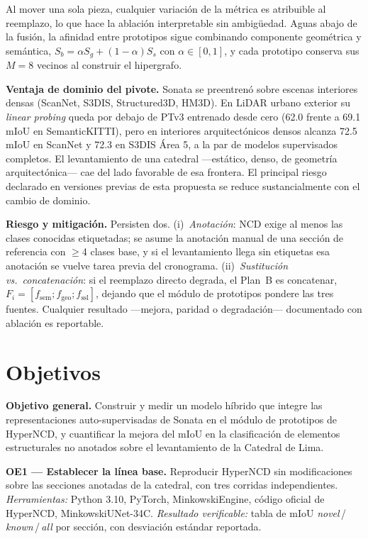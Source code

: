 \documentclass[9pt,twocolumn,a4paper]{extarticle}
\begin{document}
Al mover una sola pieza, cualquier variación de la métrica es atribuible al
reemplazo, lo que hace la ablación interpretable sin ambigüedad. Aguas abajo
de la fusión, la afinidad entre prototipos sigue combinando componente
geométrica y semántica, $S_b=\alpha S_g+(1-\alpha)S_s$ con $\alpha\in[0,1]$,
y cada prototipo conserva sus $M{=}8$ vecinos al construir el hipergrafo.

\textbf{Ventaja de dominio del pivote.} Sonata se preentrenó sobre escenas
interiores densas (ScanNet, S3DIS, Structured3D, HM3D). En LiDAR urbano
exterior su \emph{linear probing} queda por debajo de PTv3 entrenado desde
cero (62.0 frente a 69.1 mIoU en SemanticKITTI), pero en interiores
arquitectónicos densos alcanza 72.5 mIoU en ScanNet y 72.3 en S3DIS Área 5,
a la par de modelos supervisados completos. El levantamiento de una catedral
---estático, denso, de geometría arquitectónica--- cae del lado favorable de
esa frontera. El principal riesgo declarado en versiones previas de esta
propuesta se reduce sustancialmente con el cambio de dominio.

\textbf{Riesgo y mitigación.} Persisten dos. (i)~\emph{Anotación}: NCD exige
al menos las clases conocidas etiquetadas; se asume la anotación manual de
una sección de referencia con $\geq$4 clases base, y si el levantamiento
llega sin etiquetas esa anotación se vuelve tarea previa del cronograma.
(ii)~\emph{Sustitución vs.\ concatenación}: si el reemplazo directo degrada,
el Plan~B es concatenar,
$F_i=[f_{\mathrm{sem}};f_{\mathrm{geo}};f_{\mathrm{ssl}}]$, dejando que el
módulo de prototipos pondere las tres fuentes. Cualquier resultado
---mejora, paridad o degradación--- documentado con ablación es reportable.


\section{Objetivos}
\textbf{Objetivo general.} Construir y medir un modelo híbrido que integre
las representaciones auto-supervisadas de Sonata en el módulo de prototipos
de HyperNCD, y cuantificar la mejora del mIoU en la clasificación de
elementos estructurales no anotados sobre el levantamiento de la Catedral de
Lima.

\textbf{OE1 --- Establecer la línea base.} Reproducir HyperNCD sin
modificaciones sobre las secciones anotadas de la catedral, con tres corridas
independientes. \emph{Herramientas:} Python 3.10, PyTorch, MinkowskiEngine,
código oficial de HyperNCD, MinkowskiUNet-34C. \emph{Resultado verificable:}
tabla de mIoU \emph{novel}\,/\,\emph{known}\,/\,\emph{all} por sección, con
desviación estándar reportada.
\end{document}
